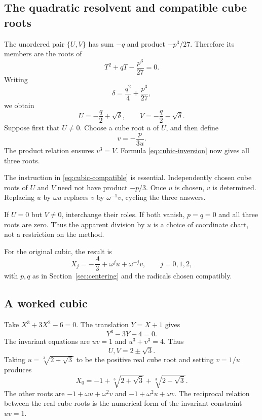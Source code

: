 \documentclass[11pt]{article}
\theoremstyle{remark}
\begin{document}
\subsection{The quadratic resolvent and compatible cube roots}

The unordered pair \(\{U,V\}\) has sum \(-q\) and product \(-p^3/27\). Therefore its members are the roots of
\begin{equation}
T^2+qT-\frac{p^3}{27}=0.
\label{eq:cubic-resolvent}
\end{equation}
Writing
\[
\delta=\frac{q^2}{4}+\frac{p^3}{27},
\]
we obtain
\[
U=-\frac q2+\sqrt\delta,\qquad
V=-\frac q2-\sqrt\delta.
\]
Suppose first that \(U\ne0\). Choose a cube root \(u\) of \(U\), and then define
\begin{equation}
v=-\frac{p}{3u}.
\label{eq:cubic-compatible}
\end{equation}
The product relation ensures \(v^3=V\). Formula \eqref{eq:cubic-inversion} now gives all three roots.

The instruction in \eqref{eq:cubic-compatible} is essential. Independently chosen cube roots of \(U\) and \(V\) need not have product \(-p/3\). Once \(u\) is chosen, \(v\) is determined. Replacing \(u\) by \(\omega u\) replaces \(v\) by \(\omega^{-1}v\), cycling the three answers.

If \(U=0\) but \(V\ne0\), interchange their roles. If both vanish, \(p=q=0\) and all three roots are zero. Thus the apparent division by \(u\) is a choice of coordinate chart, not a restriction on the method.

For the original cubic, the result is
\begin{equation}
X_j=-\frac A3+\omega^ju+\omega^{-j}v,\qquad j=0,1,2,
\label{eq:cardano-final}
\end{equation}
with \(p,q\) as in Section~\ref{sec:centering} and the radicals chosen compatibly.

\subsection{A worked cubic}

Take \(X^3+3X^2-6=0\). The translation \(Y=X+1\) gives
\[
Y^3-3Y-4=0.
\]
The invariant equations are \(uv=1\) and \(u^3+v^3=4\). Thus
\[
U,V=2\pm\sqrt3.
\]
Taking \(u=\sqrt[3]{2+\sqrt3}\) to be the positive real cube root and setting \(v=1/u\) produces
\[
X_0=-1+\sqrt[3]{2+\sqrt3}+\sqrt[3]{2-\sqrt3}.
\]
The other roots are \(-1+\omega u+\omega^2v\) and \(-1+\omega^2u+\omega v\). The reciprocal relation between the real cube roots is the numerical form of the invariant constraint \(uv=1\).
\end{document}
